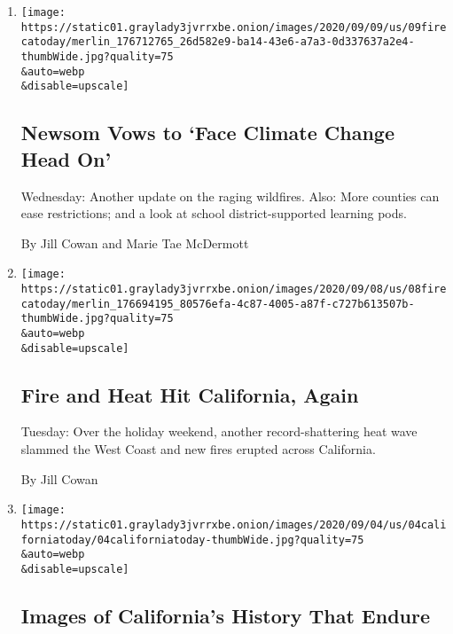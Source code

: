\begin{enumerate}
\def\labelenumi{\arabic{enumi}.}
\item
  \href{/2020/09/09/us/california-wildfires.html}{}

  \texttt{[image: https://static01.graylady3jvrrxbe.onion/images/2020/09/09/us/09firecatoday/merlin\_176712765\_26d582e9-ba14-43e6-a7a3-0d337637a2e4-thumbWide.jpg?quality=75\\\&auto=webp\\\&disable=upscale]}

  \hypertarget{newsom-vows-to-face-climate-change-head-on}{%
  \subsection{Newsom Vows to `Face Climate Change Head
  On'}\label{newsom-vows-to-face-climate-change-head-on}}

  Wednesday: Another update on the raging wildfires. Also: More counties
  can ease restrictions; and a look at school district-supported
  learning pods.

  By Jill Cowan and Marie Tae McDermott
\item
  \href{/2020/09/08/us/california-wildfire-heat-wave.html}{}

  \texttt{[image: https://static01.graylady3jvrrxbe.onion/images/2020/09/08/us/08firecatoday/merlin\_176694195\_80576efa-4c87-4005-a87f-c727b613507b-thumbWide.jpg?quality=75\\\&auto=webp\\\&disable=upscale]}

  \hypertarget{fire-and-heat-hit-california-again}{%
  \subsection{Fire and Heat Hit California,
  Again}\label{fire-and-heat-hit-california-again}}

  Tuesday: Over the holiday weekend, another record-shattering heat wave
  slammed the West Coast and new fires erupted across California.

  By Jill Cowan
\item
  \href{/2020/09/04/us/california-immigrant-worker-photos-dorothea-lange.html}{}

  \texttt{[image: https://static01.graylady3jvrrxbe.onion/images/2020/09/04/us/04californiatoday/04californiatoday-thumbWide.jpg?quality=75\\\&auto=webp\\\&disable=upscale]}

  \hypertarget{images-of-californias-history-that-endure}{%
  \subsection{Images of California's History That
  Endure}\label{images-of-californias-history-that-endure}}


\end{enumerate}
